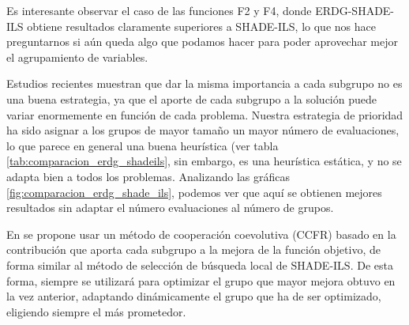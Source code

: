 Es interesante observar el caso de las funciones F2 y F4, donde ERDG-SHADE-ILS obtiene resultados claramente superiores a SHADE-ILS, lo que nos hace preguntarnos si aún queda algo que podamos hacer para poder aprovechar mejor el agrupamiento de variables. 

	Estudios recientes muestran que dar la misma importancia a cada subgrupo no es una buena estrategia, ya que el aporte de cada subgrupo a la solución puede variar enormemente en función de cada problema. Nuestra estrategia de prioridad ha sido asignar a los grupos de mayor tamaño un mayor número de evaluaciones, lo que parece en general una buena heurística (ver tabla \ref{tab:comparacion_erdg_shadeils}, sin embargo, es una heurística estática, y no se adapta bien a todos los problemas. Analizando las gráficas \ref{fig:comparacion_erdg_shade_ils}, podemos ver que aquí se obtienen mejores resultados sin adaptar el número evaluaciones al número de grupos.
	
	En \cite{CBCC} se propone usar un método de cooperación coevolutiva (CCFR) basado en la contribución que aporta cada subgrupo a la mejora de la función objetivo, de forma similar al método de selección de búsqueda local de SHADE-ILS. De esta forma, siempre se utilizará para optimizar el grupo que mayor mejora obtuvo en la vez anterior, adaptando dinámicamente el grupo que ha de ser optimizado, eligiendo siempre el más prometedor.
	

